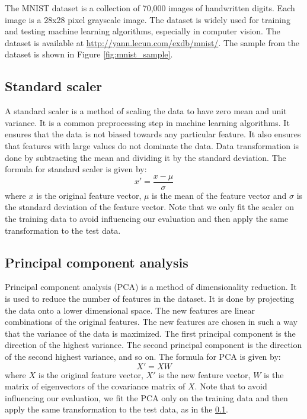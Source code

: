 \documentclass{article}
\begin{document}
The MNIST dataset is a collection of 70,000 images of handwritten digits. Each image is a 28x28 pixel grayscale image. The dataset is widely used for training and testing machine learning algorithms, especially in computer vision. The dataset is available at \url{http://yann.lecun.com/exdb/mnist/}. The sample from the dataset is shown in Figure \ref{fig:mnist_sample}.

\subsection{Standard scaler}
\label{subsec:standard_scaler}
A standard scaler is a method of scaling the data to have zero mean and unit variance. It is a common preprocessing step in machine learning algorithms. It ensures that the data is not biased towards any particular feature. It also ensures that features with large values do not dominate the data. Data transformation is done by subtracting the mean and dividing it by the standard deviation. The formula for standard scaler is given by:
\begin{equation}
    x' = \frac{x - \mu}{\sigma}
\end{equation}
where $x$ is the original feature vector, $\mu$ is the mean of the feature vector and $\sigma$ is the standard deviation of the feature vector. Note that we only fit the scaler on the training data to avoid influencing our evaluation and then apply the same transformation to the test data.

\subsection{Principal component analysis}
\label{subsec:pca}
Principal component analysis (PCA) is a method of dimensionality reduction. It is used to reduce the number of features in the dataset. It is done by projecting the data onto a lower dimensional space. The new features are linear combinations of the original features. The new features are chosen in such a way that the variance of the data is maximized. The first principal component is the direction of the highest variance. The second principal component is the direction of the second highest variance, and so on. The formula for PCA is given by:
\begin{equation}
    X' = XW
\end{equation}
where $X$ is the original feature vector, $X'$ is the new feature vector, $W$ is the matrix of eigenvectors of the covariance matrix of $X$. Note that to avoid influencing our evaluation, we fit the PCA only on the training data and then apply the same transformation to the test data, as in the \ref{subsec:standard_scaler}.
\end{document}

